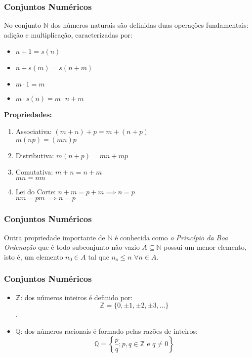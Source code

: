 \documentclass[hyperref={pdfpagelabels=false}]{beamer}
\begin{document}
\begin{frame}
\frametitle{Conjuntos Numéricos}
No conjunto $\mathbb{N}$ dos números naturais são definidas duas operações fundamentais: adição e multiplicação, caracterizadas por:
\begin{multicols}{2}
\begin{itemize}
	\item $n+1 = s(n)$
	\item $n+s(m) = s(n+m)$
	\item $m \cdot 1 = m$
	\item $m \cdot s(n) = m \cdot n + m$
\end{itemize}
\end{multicols}

\textbf{Propriedades:}
\begin{enumerate}
	\item Associativa: $(m+n)+p = m+(n+p)$ \\ $m(np)=(mn)p$
	\item Distributiva: $m(n+p)=mn + mp$
	\item Comutativa: $m+n = n+m$ \\ $mn=nm$
	\item Lei do Corte: $n+m = p+m \implies n=p$ \\ $nm=pm \implies n=p$
\end{enumerate}

\end{frame}


\begin{frame}
\frametitle{Conjuntos Numéricos}
Outra propriedade importante de $\mathbb{N}$ é conhecida como {\it o Princípio da Boa Ordenação} que é todo subconjunto não-vazio $A \subseteq \mathbb{N}$ possui um menor elemento, isto é, um elemento $n_0 \in A$ tal que $n_o \leq n$ $\forall n \in A$.

\end{frame}

\begin{frame}
\frametitle{Conjuntos Numéricos}

\begin{itemize}
 \item $\mathbb{Z}$: \pause dos números inteiros é definido por: $$\mathbb{Z} = \{ 0, \pm 1, \pm 2, \pm 3, \dots \}$$. \pause
 \item $\mathbb{Q}$: \pause dos números racionais é formado pelas razões de inteiros: $$ \mathbb{Q} = \left\{ \frac{p}{q} ; p,q \in \mathbb{Z} \text{ e } q \neq 0 \right\}$$
\end{itemize}

\end{frame}
\end{document}

